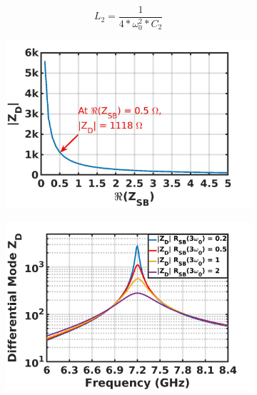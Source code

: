 \documentclass[conference]{IEEEtran}
\begin{document}
\vspace{-0.05in}
\begin{equation}
    L_2=\frac{1}{4*\omega_0^2*C_2}%
    \label{eqn:Design_A_2H}
\end{equation}

\begin{figure}[!t]
\captionsetup{font=footnotesize}
\centering
\begin{subfigure}{0.24\textwidth}
\includegraphics[width=1\textwidth]{Images/Design/Design_A_Zn_3H.jpg}
\caption{}
\label{fig:Design_A_Zn_3H}
\end{subfigure}
\begin{subfigure}{0.24\textwidth}
\includegraphics[width=1\textwidth]{Images/Design/Design_A_Rn_var_3H.jpg}
\caption{}
\label{fig:Design_A_Rn_var_3H}
\end{subfigure}

\end{figure}
\end{document}
